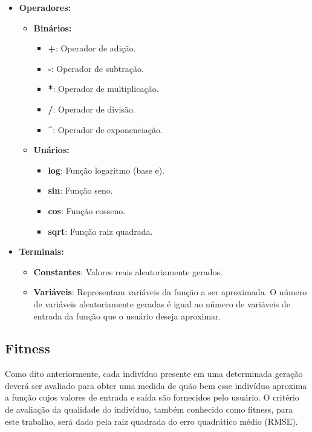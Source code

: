 \documentclass[12pt]{article}
\begin{document}
\begin{itemize}
 \item \textbf{Operadores:}
 \begin{itemize}
  \item \textbf{Binários:}
   \begin{itemize}
    \item \textbf{+}: Operador de adição.
    \item \textbf{-}: Operador de subtração.
    \item \textbf{*}: Operador de multiplicação.
    \item \textbf{/}: Operador de divisão.
    \item \textbf{\^}: Operador de exponenciação.
   \end{itemize}
   
   \item \textbf{Unários:}
   \begin{itemize}
    \item \textbf{log}: Função logaritmo (base e).
    \item \textbf{sin}: Função seno.
    \item \textbf{cos}: Função cosseno.
    \item \textbf{sqrt}: Função raiz quadrada.
   \end{itemize}

 \end{itemize}
 
 \item \textbf{Terminais:}
 \begin{itemize}
  \item \textbf{Constantes}: Valores reais aleatoriamente gerados.
  \item \textbf{Variáveis}: Representam variáveis da função a ser aproximada.
  O número de variáveis aleatoriamente geradas é igual ao número de variáveis
  de entrada da função que o usuário deseja aproximar.
 \end{itemize}
 
\end{itemize}

\subsection{Fitness}

Como dito anteriormente, cada indivíduo presente em uma determinada geração
deverá ser avaliado para obter uma medida de quão bem esse indivíduo aproxima
a função cujos valores de entrada e saída são fornecidos pelo usuário. O critério
de avaliação da qualidade do indivíduo, também conhecido como fitness, para este
trabalho, será dado pela raiz quadrada do erro quadrático médio (RMSE).
\end{document}
